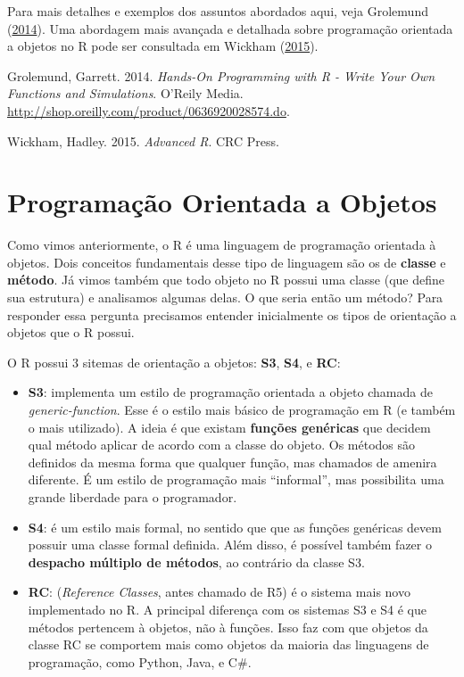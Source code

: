 \documentclass[10pt,a4paper]{book}
\providecommand{\tightlist}{%
  \setlength{\itemsep}{0pt}\setlength{\parskip}{0pt}}
\begin{document}
Para mais detalhes e exemplos dos assuntos abordados aqui, veja
Grolemund (\protect\hyperlink{ref-Grolemund2014}{2014}). Uma abordagem
mais avançada e detalhada sobre programação orientada a objetos no R
pode ser consultada em Wickham
(\protect\hyperlink{ref-Wickham2015}{2015}).

\hypertarget{refs}{}
\hypertarget{ref-Grolemund2014}{}
Grolemund, Garrett. 2014. \emph{Hands-On Programming with R - Write Your
Own Functions and Simulations}. O'Reily Media.
\url{http://shop.oreilly.com/product/0636920028574.do}.

\hypertarget{ref-Wickham2015}{}
Wickham, Hadley. 2015. \emph{Advanced R}. CRC Press.

\chapter{Programação Orientada a
Objetos}\label{programacao-orientada-a-objetos}

Como vimos anteriormente, o R é uma linguagem de programação orientada à
objetos. Dois conceitos fundamentais desse tipo de linguagem são os de
\textbf{classe} e \textbf{método}. Já vimos também que todo objeto no R
possui uma classe (que define sua estrutura) e analisamos algumas delas.
O que seria então um método? Para responder essa pergunta precisamos
entender inicialmente os tipos de orientação a objetos que o R possui.

O R possui 3 sitemas de orientação a objetos: \textbf{S3}, \textbf{S4},
e \textbf{RC}:

\begin{itemize}
\tightlist
\item
  \textbf{S3}: implementa um estilo de programação orientada a objeto
  chamada de \emph{generic-function}. Esse é o estilo mais básico de
  programação em R (e também o mais utilizado). A ideia é que existam
  \textbf{funções genéricas} que decidem qual método aplicar de acordo
  com a classe do objeto. Os métodos são definidos da mesma forma que
  qualquer função, mas chamados de amenira diferente. É um estilo de
  programação mais ``informal'', mas possibilita uma grande liberdade
  para o programador.
\item
  \textbf{S4}: é um estilo mais formal, no sentido que que as funções
  genéricas devem possuir uma classe formal definida. Além disso, é
  possível também fazer o \textbf{despacho múltiplo de métodos}, ao
  contrário da classe S3.
\item
  \textbf{RC}: (\emph{Reference Classes}, antes chamado de R5) é o
  sistema mais novo implementado no R. A principal diferença com os
  sistemas S3 e S4 é que métodos pertencem à objetos, não à funções.
  Isso faz com que objetos da classe RC se comportem mais como objetos
  da maioria das linguagens de programação, como Python, Java, e C\#.
\end{itemize}
\end{document}
